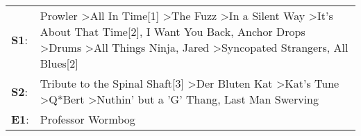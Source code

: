 \begin{supertabular}{p{0.03\textwidth}p{0.92\textwidth}}
 \textbf{S1}:  &  Prowler\textsuperscript{} \textgreater \enspace All In Time[1]\textsuperscript{} \textgreater \enspace The Fuzz\textsuperscript{} \textgreater \enspace In a Silent Way\textsuperscript{} \textgreater \enspace It's About That Time[2]\textsuperscript{}, \enspace I Want You Back\textsuperscript{}, \enspace Anchor Drops\textsuperscript{} \textgreater \enspace Drums\textsuperscript{} \textgreater \enspace All Things Ninja\textsuperscript{}, \enspace Jared\textsuperscript{} \textgreater \enspace Syncopated Strangers\textsuperscript{}, \enspace All Blues[2]\textsuperscript{}  \enspace  \\
 \textbf{S2}:  &                                                                                                                                                                                                                                                                        Tribute to the Spinal Shaft[3]\textsuperscript{} \textgreater \enspace Der Bluten Kat\textsuperscript{} \textgreater \enspace Kat's Tune\textsuperscript{} \textgreater \enspace Q*Bert\textsuperscript{} \textgreater \enspace Nuthin' but a 'G' Thang\textsuperscript{}, \enspace Last Man Swerving\textsuperscript{}  \enspace  \\
 \textbf{E1}:  &                                                                                                                                                                                                                                                                                                                                                                                                                                                                                                                                                            Professor Wormbog\textsuperscript{}  \enspace  \\
\end{supertabular}
